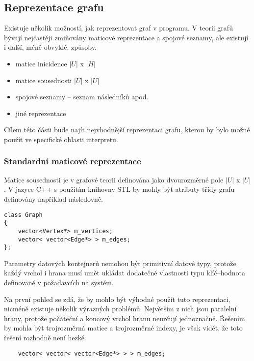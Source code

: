 \documentclass[11pt,twoside,a4paper]{book}
\begin{document}
\subsection{Reprezentace grafu}

Existuje několik možností, jak reprezentovat graf v programu. V teorii grafů bývají nejčastěji zmi\-ňo\-vá\-ny maticové reprezentace a spojové seznamy, ale existují i další, méně obvyklé, způsoby.


\begin{itemize}
\item matice inicidence $|U|$ x $|H|$
\item matice sousednosti $|U|$ x $|U|$
\item spojové seznamy -- seznam následníků apod.
\item jiné reprezentace
\end{itemize}

Cílem této části bude najít nejvhodnější reprezentaci grafu, kterou by bylo možné použít ve specifické oblasti interpretu.


\subsubsection{Standardní maticové reprezentace}


Matice sousednosti je v grafové teorii definována jako dvourozměrné pole $|U|$ x $|U|$. V jazyce C++ s použitím knihovny STL by mohly být atributy třídy grafu definovány například následovně.

\begin{verbatim}
class Graph
{
    vector<Vertex*> m_vertices;
    vector< vector<Edge*> > m_edges;
};
\end{verbatim}

Parametry datových kontejnerů nemohou být primitivní datové typy, protože každý vrchol i hrana musí umět ukládat dodatečné vlastnosti typu klíč--hodnota definované v požadavcích na systém.

Na první pohled se zdá, že by mohlo být výhodné použít tuto reprezentaci, nicméně existuje několik výrazných problémů. Největším z nich jsou paralelní hrany, protože počáteční a koncový vrchol hranu neurčují jednoznačně. Řešením by mohla být trojrozměrná matice a trojrozměrné indexy, je však vidět, že toto řešení rozhodně není hezké.

\begin{verbatim}
    vector< vector< vector<Edge*> > > m_edges;
\end{verbatim}
\end{document}
